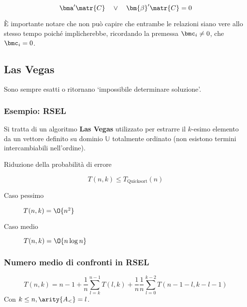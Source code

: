 \documentclass[\main/main.tex]{subfiles}
\begin{document}
\[
	\bma' \matr{C} \quad \lor \quad \bm{\beta}'\matr{C} = 0
\]

È importante notare che non può capire che entrambe le relazioni siano vere allo stesso tempo poiché implicherebbe, ricordando la premessa \(\bmc_i \neq 0\), che \(\bmc_i = 0\).

\subsection{Las Vegas}
Sono sempre esatti o ritornano `impossibile determinare soluzione'.

\subsubsection{Esempio: RSEL}
Si tratta di un algoritmo \textbf{Las Vegas} utilizzato per estrarre il \(k\)-esimo elemento da un vettore definito su dominio \(\mathbb{U}\) totalmente ordinato (non esistono termini intercambiabili nell'ordine).

\IncMargin{1em}
\begin{algorithm}
	\BlankLine
	\caption{Riduzione della probabilità di errore}
\end{algorithm}\DecMargin{1em}

\[
	T(n,k) \leq T_{\text{Quicksort}}(n)
\]
\begin{description}
	\item[Caso pessimo] \(T(n,k) = \O{n^2}\)
	\item[Caso medio] \(T(n,k) = \O{n\log{n}}\)
\end{description}

\subsubsection{Numero medio di confronti in RSEL}
\[
	T(n,k) = n-1 + \frac{1}{n}\sum_{l=k}^{n-1} T(l,k) + \frac{1}{n} \frac{1}{n}\sum_{l=0}^{k-2} T(n-1-l, k-l-1)
\]
Con \(k\leq n, \arity{A_<} = l\).
\end{document}
